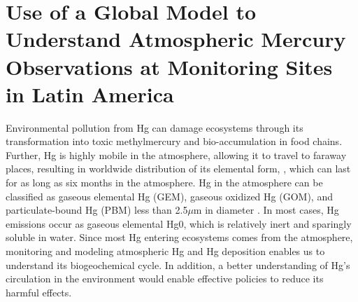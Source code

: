 \chapter{Use of a Global Model to Understand Atmospheric Mercury Observations at Monitoring Sites in Latin America }
\begin{flushleft}
Environmental pollution from Hg can damage ecosystems through its transformation into toxic methylmercury and bio-accumulation in food chains. Further, Hg is highly mobile in the atmosphere, allowing it to travel to faraway places, resulting in worldwide distribution of its elemental form, \hg, which can last for as long as six months in the atmosphere\cite{horowitz_new_2017,shah_improved_2021}. Hg in the atmosphere can be classified as gaseous elemental Hg (GEM), gaseous oxidized Hg (GOM), and particulate-bound Hg (PBM) less than 2.5$\mu$m in diameter \cite{lindberg_synthesis_2007,schroeder_atmospheric_1998,landis_development_2002}. In most cases, Hg emissions occur as gaseous elemental Hg0, which is relatively inert and sparingly soluble in water\cite{horowitz_new_2017}. Since most Hg entering ecosystems comes from the atmosphere, monitoring and modeling atmospheric Hg and Hg deposition enables us to understand its biogeochemical cycle. In addition, a better understanding of Hg's circulation in the environment would enable effective policies to reduce its harmful effects.
\end{flushleft}
